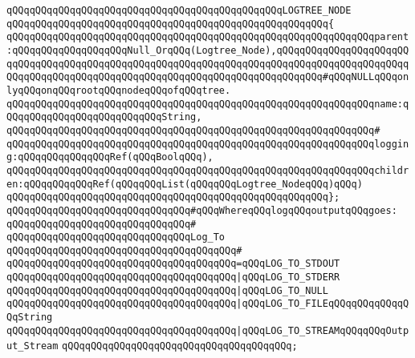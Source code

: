 \verb|qQQqqQQqqQQqqQQqqQQqqQQqqQQqqQQqqQQqqQQqqQQqqQQqLOGTREE_NODE|\newline
\verb|qQQqqQQqqQQqqQQqqQQqqQQqqQQqqQQqqQQqqQQqqQQqqQQqqQQqqQQq{|\newline
\verb|qQQqqQQqqQQqqQQqqQQqqQQqqQQqqQQqqQQqqQQqqQQqqQQqqQQqqQQqqQQqqQQqparent:qQQqqQQqqQQqqQQqqQQqNull_OrqQQq(Logtree_Node),qQQqqQQqqQQqqQQqqQQqqQQqqQQqqQQqqQQqqQQqqQQqqQQqqQQqqQQqqQQqqQQqqQQqqQQqqQQqqQQqqQQqqQQqqQQqqQQqqQQqqQQqqQQqqQQqqQQqqQQqqQQqqQQqqQQqqQQqqQQqqQQqqQQq#qQQqNULLqQQqonlyqQQqonqQQqrootqQQqnodeqQQqofqQQqtree.|\newline
\verb|qQQqqQQqqQQqqQQqqQQqqQQqqQQqqQQqqQQqqQQqqQQqqQQqqQQqqQQqqQQqqQQqname:qQQqqQQqqQQqqQQqqQQqqQQqqQQqString,|\newline
\verb|qQQqqQQqqQQqqQQqqQQqqQQqqQQqqQQqqQQqqQQqqQQqqQQqqQQqqQQqqQQqqQQq#|\newline
\verb|qQQqqQQqqQQqqQQqqQQqqQQqqQQqqQQqqQQqqQQqqQQqqQQqqQQqqQQqqQQqqQQqlogging:qQQqqQQqqQQqqQQqRef(qQQqBoolqQQq),|\newline
\verb|qQQqqQQqqQQqqQQqqQQqqQQqqQQqqQQqqQQqqQQqqQQqqQQqqQQqqQQqqQQqqQQqchildren:qQQqqQQqqQQqRef(qQQqqQQqList(qQQqqQQqLogtree_NodeqQQq)qQQq)|\newline
\verb|qQQqqQQqqQQqqQQqqQQqqQQqqQQqqQQqqQQqqQQqqQQqqQQqqQQqqQQq};|\newline
\newline
\newline
\verb|qQQqqQQqqQQqqQQqqQQqqQQqqQQqqQQq#qQQqWhereqQQqlogqQQqoutputqQQqgoes:|\newline
\verb|qQQqqQQqqQQqqQQqqQQqqQQqqQQqqQQq#|\newline
\verb|qQQqqQQqqQQqqQQqqQQqqQQqqQQqqQQqLog_To|\newline
\verb|qQQqqQQqqQQqqQQqqQQqqQQqqQQqqQQqqQQqqQQq#|\newline
\verb|qQQqqQQqqQQqqQQqqQQqqQQqqQQqqQQqqQQqqQQq=qQQqLOG_TO_STDOUT|\newline
\verb|qQQqqQQqqQQqqQQqqQQqqQQqqQQqqQQqqQQqqQQq|\verb#|qQQqLOG_TO_STDERR#\newline
\verb|qQQqqQQqqQQqqQQqqQQqqQQqqQQqqQQqqQQqqQQq|\verb#|qQQqLOG_TO_NULL#\newline
\verb|qQQqqQQqqQQqqQQqqQQqqQQqqQQqqQQqqQQqqQQq|\verb#|qQQqLOG_TO_FILEqQQqqQQqqQQqqQQqString#\newline
\verb|qQQqqQQqqQQqqQQqqQQqqQQqqQQqqQQqqQQqqQQq|\verb#|qQQqLOG_TO_STREAMqQQqqQQqOutput_Stream#\newline
\verb|qQQqqQQqqQQqqQQqqQQqqQQqqQQqqQQqqQQqqQQq;|\newline
\newline
